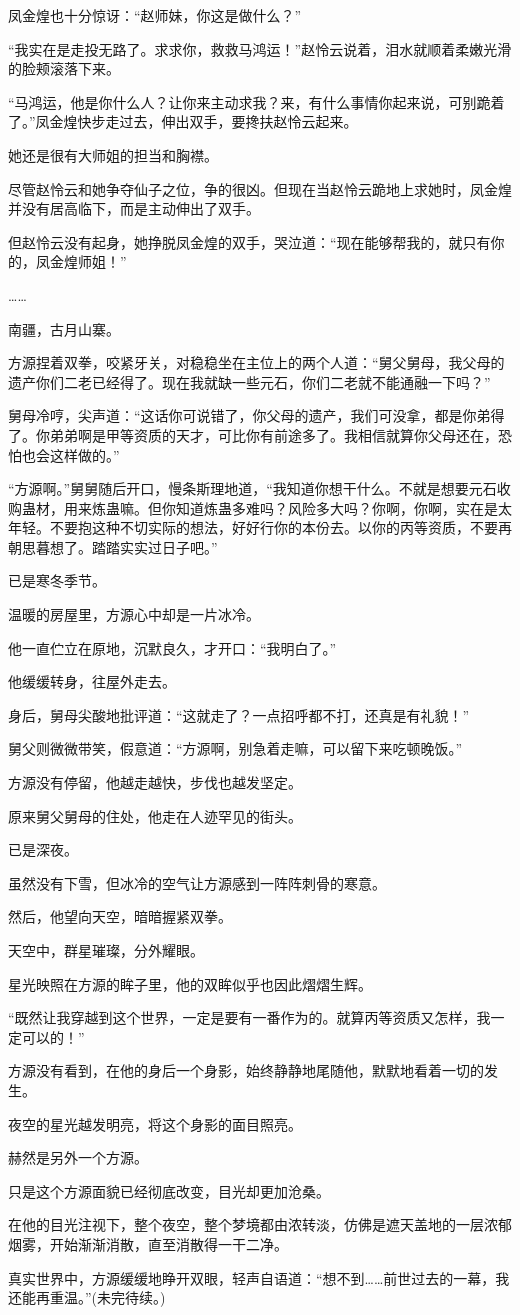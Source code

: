 \begin{this_body}
凤金煌也十分惊讶：“赵师妹，你这是做什么？”

“我实在是走投无路了。求求你，救救马鸿运！”赵怜云说着，泪水就顺着柔嫩光滑的脸颊滚落下来。

“马鸿运，他是你什么人？让你来主动求我？来，有什么事情你起来说，可别跪着了。”凤金煌快步走过去，伸出双手，要搀扶赵怜云起来。

她还是很有大师姐的担当和胸襟。

尽管赵怜云和她争夺仙子之位，争的很凶。但现在当赵怜云跪地上求她时，凤金煌并没有居高临下，而是主动伸出了双手。

但赵怜云没有起身，她挣脱凤金煌的双手，哭泣道：“现在能够帮我的，就只有你的，凤金煌师姐！”

……

南疆，古月山寨。

方源捏着双拳，咬紧牙关，对稳稳坐在主位上的两个人道：“舅父舅母，我父母的遗产你们二老已经得了。现在我就缺一些元石，你们二老就不能通融一下吗？”

舅母冷哼，尖声道：“这话你可说错了，你父母的遗产，我们可没拿，都是你弟得了。你弟弟啊是甲等资质的天才，可比你有前途多了。我相信就算你父母还在，恐怕也会这样做的。”

“方源啊。”舅舅随后开口，慢条斯理地道，“我知道你想干什么。不就是想要元石收购蛊材，用来炼蛊嘛。但你知道炼蛊多难吗？风险多大吗？你啊，你啊，实在是太年轻。不要抱这种不切实际的想法，好好行你的本份去。以你的丙等资质，不要再朝思暮想了。踏踏实实过日子吧。”

已是寒冬季节。

温暖的房屋里，方源心中却是一片冰冷。

他一直伫立在原地，沉默良久，才开口：“我明白了。”

他缓缓转身，往屋外走去。

身后，舅母尖酸地批评道：“这就走了？一点招呼都不打，还真是有礼貌！”

舅父则微微带笑，假意道：“方源啊，别急着走嘛，可以留下来吃顿晚饭。”

方源没有停留，他越走越快，步伐也越发坚定。

原来舅父舅母的住处，他走在人迹罕见的街头。

已是深夜。

虽然没有下雪，但冰冷的空气让方源感到一阵阵刺骨的寒意。

然后，他望向天空，暗暗握紧双拳。

天空中，群星璀璨，分外耀眼。

星光映照在方源的眸子里，他的双眸似乎也因此熠熠生辉。

“既然让我穿越到这个世界，一定是要有一番作为的。就算丙等资质又怎样，我一定可以的！”

方源没有看到，在他的身后一个身影，始终静静地尾随他，默默地看着一切的发生。

夜空的星光越发明亮，将这个身影的面目照亮。

赫然是另外一个方源。

只是这个方源面貌已经彻底改变，目光却更加沧桑。

在他的目光注视下，整个夜空，整个梦境都由浓转淡，仿佛是遮天盖地的一层浓郁烟雾，开始渐渐消散，直至消散得一干二净。

真实世界中，方源缓缓地睁开双眼，轻声自语道：“想不到……前世过去的一幕，我还能再重温。”(未完待续。)

\end{this_body}

